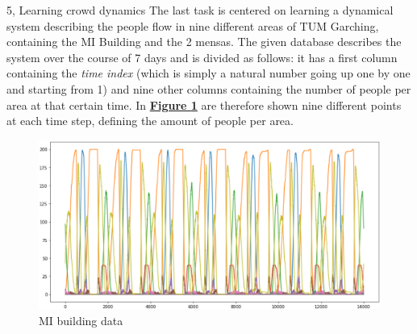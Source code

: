 \documentclass[10pt,a4paper]{article}
\begin{document}
\begin{task}{5, Learning crowd dynamics}
The last task is centered on learning a dynamical system describing the people flow in nine different areas of TUM Garching, containing the MI Building and the 2 mensas. The given database describes the system over the course of 7 days and is divided as follows: it has a first column containing the \textit{time index} (which is simply a natural number going up one by one and starting from 1) and nine other columns containing the number of people per area at that certain time. In \textbf{\hyperref[fig:task5-data]{Figure \ref{fig:task5-data}}} are therefore shown nine different points at each time step, defining the amount of people per area.
\begin{figure}[H]
    \centering
    \includegraphics[scale=0.5]{images/task5-data.png}
    \caption{MI building data}
    \label{fig:task5-data}
\end{figure}

\end{task}
\end{document}
